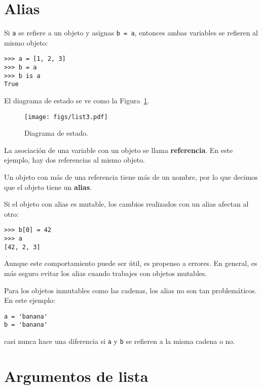 \documentclass[10pt]{book}
\begin{document}
\section{Alias}

Si {\tt a} se refiere a un objeto y asignas {\tt b = a},
entonces ambas variables se refieren al mismo objeto:

\begin{verbatim}
>>> a = [1, 2, 3]
>>> b = a
>>> b is a
True
\end{verbatim}
%
El diagrama de estado se ve como la Figura~\ref{fig.list3}.

\begin{figure}
\centerline
{\texttt{[image: figs/list3.pdf]}}
\caption{Diagrama de estado.}
\label{fig.list3}
\end{figure}

La asociación de una variable con un objeto se llama {\bf
referencia}.  En este ejemplo, hay dos referencias al mismo
objeto.

Un objeto con más de una referencia tiene más
de un nombre, por lo que decimos que el objeto tiene un {\bf alias}.

Si el objeto con alias es mutable, los cambios realizados con un alias afectan
al otro:

\begin{verbatim}
>>> b[0] = 42
>>> a
[42, 2, 3]
\end{verbatim}
%
Aunque este comportamiento puede ser útil, es propenso a errores.  En general,
es más seguro evitar los alias cuando trabajes con objetos
mutables.

Para los objetos inmutables como las cadenas, los alias no son tan
problemáticos.  En este ejemplo:

\begin{verbatim}
a = 'banana'
b = 'banana'
\end{verbatim}
%
casi nunca hace una diferencia si {\tt a} y {\tt b} se refieren
a la misma cadena o no.


\section{Argumentos de lista}
\label{list.arguments}
\end{document}
